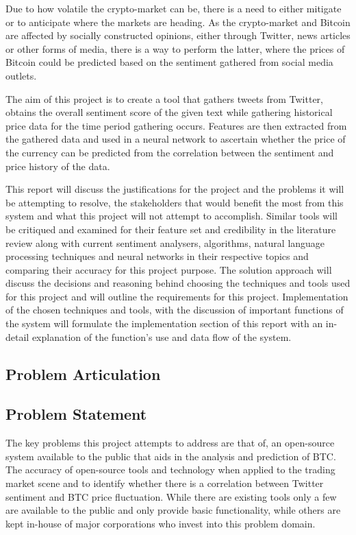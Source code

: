 \documentclass[oneside, 10pt]{article}
\begin{document}
	Due to how volatile the crypto-market can be, there is a need to either mitigate or to anticipate where the markets are heading. As the crypto-market and Bitcoin are affected by socially constructed opinions, either through Twitter, news articles or other forms of media, there is a way to perform the latter, where the prices of Bitcoin could be predicted based on the sentiment gathered from social media outlets.
	
	The aim of this project is to create a tool that gathers tweets from Twitter, obtains the overall sentiment score of the given text while gathering historical price data for the time period gathering occurs. Features are then extracted from the gathered data and used in a neural network to ascertain whether the price of the currency can be predicted from the correlation between the sentiment and price history of the data.
	
	This report will discuss the justifications for the project and the problems it will be attempting to resolve, the stakeholders that would benefit the most from this system and what this project will not attempt to accomplish. Similar tools will be critiqued and examined for their feature set and credibility in the literature review along with current sentiment analysers, algorithms, natural language processing techniques and neural networks in their respective topics and comparing their accuracy for this project purpose. 
	The solution approach will discuss the decisions and reasoning behind choosing the techniques and tools used for this project and will outline the requirements for this project.
	Implementation of the chosen techniques and tools, with the discussion of important functions of the system will formulate the implementation section of this report with an in-detail explanation of the function's use and data flow of the system.
	
	\newpage
	
	\begin{center}
		\section{Problem Articulation}\label{problem}
	\end{center}
		
		\subsection{Problem Statement}\label{statement}
		
		The key problems this project attempts to address are that of, an open-source system available to the public that aids in the analysis and prediction of BTC. The accuracy of open-source tools and technology when applied to the trading market scene and to identify whether there is a correlation between Twitter sentiment and BTC price fluctuation. While there are existing tools only a few are available to the public and only provide basic functionality, while others are kept in-house of major corporations who invest into this problem domain.
		
\end{document}
